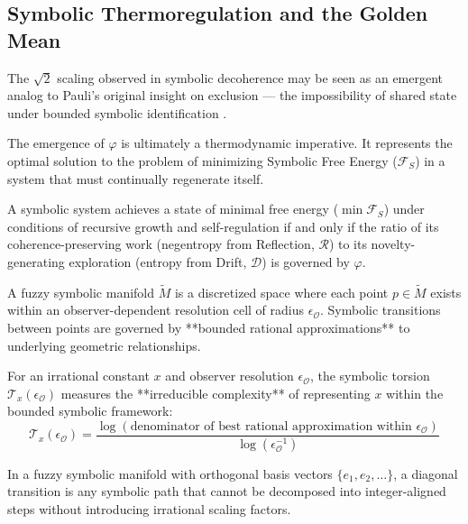 \subsection{Symbolic Thermoregulation and the Golden Mean}
\label{subsec:bk5_thermoregulation_and_phi}

The $\sqrt{2}$ scaling observed in symbolic decoherence may be seen as an emergent analog to Pauli’s original insight on exclusion — the impossibility of shared state under bounded symbolic identification \cite{pauli1925exclusion}.

The emergence of $\varphi$ is ultimately a thermodynamic imperative. It represents the optimal solution to the problem of minimizing Symbolic Free Energy ($\mathcal{F}_S$) in a system that must continually regenerate itself.

\begin{proposition}
\label{prop:bk5_golden_ratio_thermodynamic_optimum}
A symbolic system achieves a state of minimal free energy ($\min \mathcal{F}_S$) under conditions of recursive growth and self-regulation if and only if the ratio of its coherence-preserving work (negentropy from Reflection, $\mathcal{R}$) to its novelty-generating exploration (entropy from Drift, $\mathcal{D}$) is governed by $\varphi$.
\end{proposition}

\begin{definition}
\label{def:bk5_fuzzy_symbolic_manifold}
A fuzzy symbolic manifold $\tilde{M}$ is a discretized space where each point $p \in \tilde{M}$ exists within an observer-dependent resolution cell of radius $\epsilon_\mathcal{O}$. Symbolic transitions between points are governed by **bounded rational approximations** to underlying geometric relationships.
\end{definition}

\begin{definition}
\label{def:bk5_symbolic_torsion}
For an irrational constant $x$ and observer resolution $\epsilon_\mathcal{O}$, the symbolic torsion $\mathcal{T}_x(\epsilon_\mathcal{O})$ measures the **irreducible complexity** of representing $x$ within the bounded symbolic framework:
$$\mathcal{T}_x(\epsilon_\mathcal{O}) = \frac{\log(\text{denominator of best rational approximation within } \epsilon_\mathcal{O})}{\log(\epsilon_\mathcal{O}^{-1})}$$
\end{definition}

\begin{definition}
\label{def:bk5_diagonal_transition}
In a fuzzy symbolic manifold with orthogonal basis vectors $\{e_1, e_2, \ldots\}$, a diagonal transition is any symbolic path that cannot be decomposed into integer-aligned steps without introducing irrational scaling factors.
\end{definition}

